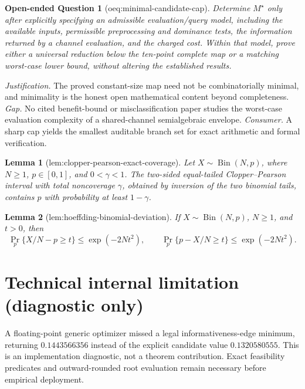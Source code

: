 \documentclass{article}
\newtheorem{lemma}{Lemma}
\newtheorem{openendedquestion}{Open-ended Question}
\begin{document}
\begin{openendedquestion}[oeq:minimal-candidate-cap]\label{oeq:minimal-candidate-cap}
Determine \(M^{\star}\) only after explicitly specifying an admissible evaluation/query model, including the available inputs, permissible preprocessing and dominance tests, the information returned by a channel evaluation, and the charged cost.  Within that model, prove either a universal reduction below the ten-point complete map or a matching worst-case lower bound, without altering the established results.
\end{openendedquestion}
\par\smallskip\noindent \textit{Justification.} The proved constant-size map need not be combinatorially minimal, and minimality is the honest open mathematical content beyond completeness. \textit{Gap.} No cited benefit-bound or misclassification paper studies the worst-case evaluation complexity of a shared-channel semialgebraic envelope. \textit{Consumer.} A sharp cap yields the smallest auditable branch set for exact arithmetic and formal verification.

\begin{lemma}[lem:clopper-pearson-exact-coverage]\label{lem:clopper-pearson-exact-coverage}
Let \(X\sim\operatorname{Bin}(N,p)\), where \(N\geq1\), \(p\in[0,1]\), and \(0<\gamma<1\).  The two-sided equal-tailed Clopper--Pearson interval with total noncoverage \(\gamma\), obtained by inversion of the two binomial tails, contains \(p\) with probability at least \(1-\gamma\).
\end{lemma}

\begin{lemma}[lem:hoeffding-binomial-deviation]\label{lem:hoeffding-binomial-deviation}
If \(X\sim\operatorname{Bin}(N,p)\), \(N\geq1\), and \(t>0\), then
\[
 \Pr_p\{X/N-p\geq t\}\leq \exp(-2Nt^2),
 \qquad
 \Pr_p\{p-X/N\geq t\}\leq \exp(-2Nt^2).
\]
\end{lemma}

\section*{Technical internal limitation (diagnostic only)}

A floating-point generic optimizer missed a legal informativeness-edge minimum, returning \(0.1443566356\) instead of the explicit candidate value \(0.1320580555\). This is an implementation diagnostic, not a theorem contribution. Exact feasibility predicates and outward-rounded root evaluation remain necessary before empirical deployment.
\end{document}
